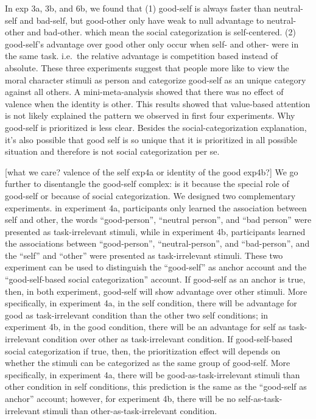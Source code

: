 \documentclass[
  english,
  man]{apa6}
\begin{document}
In exp 3a, 3b, and 6b, we found that (1) good-self is always faster than neutral-self and bad-self, but good-other only have weak to null advantage to neutral-other and bad-other. which mean the social categorization is self-centered. (2) good-self's advantage over good other only occur when self- and other- were in the same task. i.e.~the relative advantage is competition based instead of absolute. These three experiments suggest that people more like to view the moral character stimuli as person and categorize good-self as an unique category against all others. A mini-meta-analysis showed that there was no effect of valence when the identity is other. This results showed that value-based attention is not likely explained the pattern we observed in first four experiments. Why good-self is prioritized is less clear. Besides the social-categorization explanation, it's also possible that good self is so unique that it is prioritized in all possible situation and therefore is not social categorization per se.

{[}what we care? valence of the self exp4a or identity of the good exp4b?{]} We go further to disentangle the good-self complex: is it because the special role of good-self or because of social categorization. We designed two complementary experiments. in experiment 4a, participants only learned the association between self and other, the words \enquote{good-person}, \enquote{neutral person}, and \enquote{bad person} were presented as task-irrelevant stimuli, while in experiment 4b, participants learned the associations between \enquote{good-person}, \enquote{neutral-person}, and \enquote{bad-person}, and the \enquote{self} and \enquote{other} were presented as task-irrelevant stimuli. These two experiment can be used to distinguish the \enquote{good-self} as anchor account and the \enquote{good-self-based social categorization} account. If good-self as an anchor is true, then, in both experiment, good-self will show advantage over other stimuli. More specifically, in experiment 4a, in the self condition, there will be advantage for good as task-irrelevant condition than the other two self conditions; in experiment 4b, in the good condition, there will be an advantage for self as task-irrelevant condition over other as task-irrelevant condition. If good-self-based social categorization if true, then, the prioritization effect will depends on whether the stimuli can be categorized as the same group of good-self. More specifically, in experiment 4a, there will be good-as-task-irrelevant stimuli than other condition in self conditions, this prediction is the same as the \enquote{good-self as anchor} account; however, for experiment 4b, there will be no self-as-task-irrelevant stimuli than other-as-task-irrelevant condition.
\end{document}
